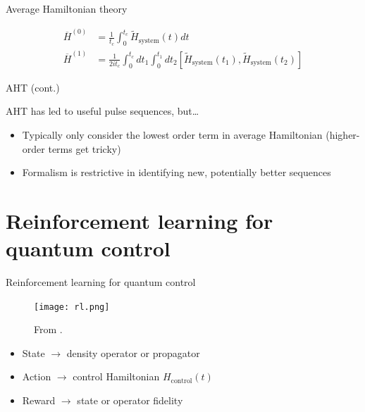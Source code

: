 \documentclass{beamer}
\begin{document}
\begin{frame}{Average Hamiltonian theory}
\begin{figure}
{\begin{tikzpicture}[x=0.75pt,y=0.75pt,yscale=-1,xscale=1]
\end{tikzpicture}
}

\end{figure}



\begin{align*}
    \overline{H}^{(0)} &= \frac{1}{t_c} \int_0^{t_c}
        \widetilde{H}_\text{system}(t) dt \\
    \overline{H}^{(1)} &= \frac{1}{2it_c} \int_0^{t_c} dt_1 \int_0^{t_1} dt_2
        [\widetilde{H}_\text{system}(t_1), \widetilde{H}_\text{system}(t_2)]
\end{align*}

\end{frame}

\begin{frame}{AHT (cont.)}

AHT has led to useful pulse sequences, but\dots
\begin{itemize}
    \item Typically only consider the lowest order term in average Hamiltonian (higher-order terms get tricky)
    \item Formalism is restrictive in identifying new, potentially better sequences
\end{itemize}

\end{frame}

\section{Reinforcement learning for quantum control}


\begin{frame}{Reinforcement learning for quantum control}

\begin{figure}
\centering
\texttt{[image: rl.png]}
\caption{From \cite{sutton2018reinforcement}.}
\end{figure}

\begin{itemize}
    \item State $\to$ density operator or propagator
    \item Action $\to$ control Hamiltonian $H_\text{control}(t)$
    \item Reward $\to$ state or operator fidelity
\end{itemize}
    
\end{frame}
\end{document}
